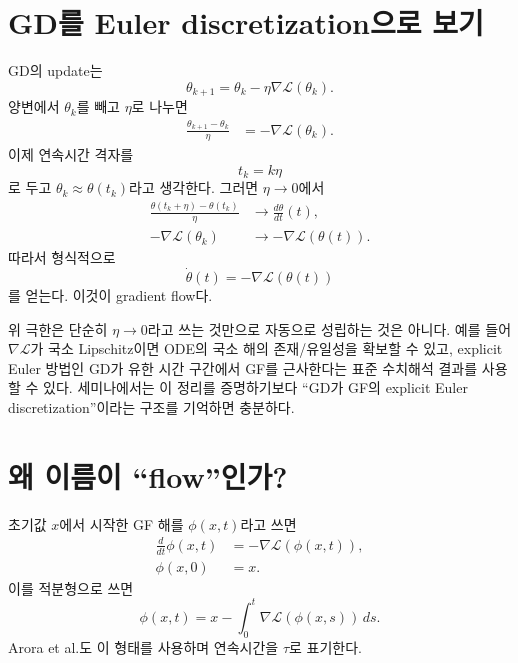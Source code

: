 \documentclass[11pt,a4paper,oneside,openany]{memoir}
\newcommand{\Loss}{\mathcal{L}}
\newcommand{\grad}{\nabla}
\theoremstyle{definition}
\begin{document}
\section{GD를 Euler discretization으로 보기}

GD의 update는
\begin{equation}
  \theta_{k+1}=\theta_k-\eta\grad\Loss(\theta_k).
  \label{eq:gd}
\end{equation}
양변에서 $\theta_k$를 빼고 $\eta$로 나누면
\begin{align}
  \frac{\theta_{k+1}-\theta_k}{\eta}
  &= -\grad\Loss(\theta_k). \label{eq:difference-quotient}
\end{align}
이제 연속시간 격자를
\[
  t_k=k\eta
\]
로 두고 $\theta_k\approx\theta(t_k)$라고 생각한다. 그러면 $\eta\to0$에서
\begin{align}
  \frac{\theta(t_k+\eta)-\theta(t_k)}{\eta}
  &\longrightarrow \frac{d\theta}{dt}(t),\\
  -\grad\Loss(\theta_k)
  &\longrightarrow -\grad\Loss(\theta(t)).
\end{align}
따라서 형식적으로
\begin{equation}
  \boxed{\dot\theta(t)=-\grad\Loss(\theta(t))}
  \label{eq:gf}
\end{equation}
를 얻는다. 이것이 gradient flow다.

\begin{suppbox}[--- ``GD $\to$ GF''에서 실제로 쓰는 가정]
위 극한은 단순히 $\eta\to0$라고 쓰는 것만으로 자동으로 성립하는 것은 아니다.
예를 들어 $\grad\Loss$가 국소 Lipschitz이면 ODE의 국소 해의 존재/유일성을 확보할 수 있고,
explicit Euler 방법인 GD가 유한 시간 구간에서 GF를 근사한다는 표준 수치해석 결과를 사용할 수 있다.
세미나에서는 이 정리를 증명하기보다 ``GD가 GF의 explicit Euler discretization''이라는 구조를 기억하면 충분하다.
\end{suppbox}

\section{왜 이름이 ``flow''인가?}

초기값 $x$에서 시작한 GF 해를 $\phi(x,t)$라고 쓰면
\begin{align}
  \frac{d}{dt}\phi(x,t)&=-\grad\Loss(\phi(x,t)),\\
  \phi(x,0)&=x.
\end{align}
이를 적분형으로 쓰면
\begin{equation}
  \phi(x,t)
  =x-\int_0^t \grad\Loss(\phi(x,s))\,ds.
  \label{eq:gf-integral}
\end{equation}
Arora et al.도 이 형태를 사용하며 연속시간을 $\tau$로 표기한다.
\end{document}
